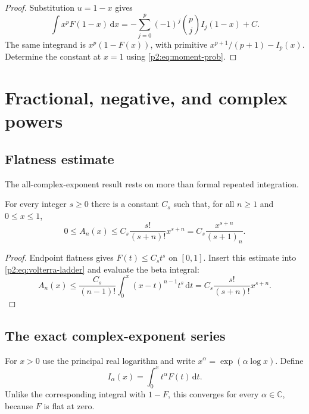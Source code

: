 \documentclass[11pt,oneside]{article}
\theoremstyle{definition}
\theoremstyle{remark}
\newcommand{\C}{\mathbb C}
\newcommand{\dd}{\,\mathrm d}
\newcommand{\1}{\mathbf 1}
\begin{document}
\begin{proof}
Substitution $u=1-x$ gives
\[
 \int x^pF(1-x)\dd x
 =-\sum_{j=0}^{p}(-1)^j\binom pjI_j(1-x)+C.
\]
The same integrand is $x^p(1-F(x))$, with primitive
$x^{p+1}/(p+1)-I_p(x)$.  Determine the constant at $x=1$ using
\eqref{p2:eq:moment-prob}.
\end{proof}

\section{Fractional, negative, and complex powers}
\label{p2:sec:complex-powers}

\subsection{Flatness estimate}
The all-complex-exponent result rests on more than formal repeated integration.

\begin{lemma}
\label{p2:lem:volterra-flatness}
For every integer $s\ge0$ there is a constant $C_s$ such that, for all
$n\ge1$ and $0\le x\le1$,
\begin{equation}
 0\le A_n(x)\le C_s\frac{s!}{(s+n)!}x^{s+n}
 =C_s\frac{x^{s+n}}{(s+1)_n}.                              \label{p2:eq:An-flat-bound}
\end{equation}
\end{lemma}

\begin{proof}
Endpoint flatness gives $F(t)\le C_st^s$ on $[0,1]$.  Insert this estimate into
\eqref{p2:eq:volterra-ladder} and evaluate the beta integral:
\[
 A_n(x)\le\frac{C_s}{(n-1)!}\int_0^x(x-t)^{n-1}t^s\dd t
 =C_s\frac{s!}{(s+n)!}x^{s+n}.
\]
\end{proof}

\subsection{The exact complex-exponent series}
For $x>0$ use the principal real logarithm and write $x^\alpha=
\exp(\alpha\log x)$.  Define
\begin{equation}
 I_\alpha(x)=\int_0^xt^\alpha F(t)\dd t.                  \label{p2:eq:Ialpha-def}
\end{equation}
Unlike the corresponding integral with $1-F$, this converges for every
$\alpha\in\C$, because $F$ is flat at zero.
\end{document}
